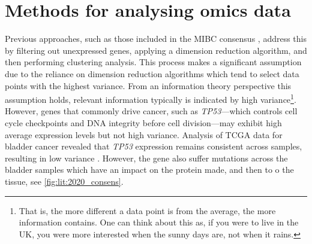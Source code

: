 
\section{Methods for analysing omics data} \label{s:lit:multi-omics}

\vspace{3mm}
\vspace{3mm}



Previous approaches, such as those included in the MIBC consensus \citep{Kamoun2020-tj}, address this by filtering out unexpressed genes, applying a dimension reduction algorithm, and then performing clustering analysis. This process makes a significant assumption due to the reliance on dimension reduction algorithms which tend to select data points with the highest variance. From an information theory perspective this assumption holds, relevant information typically is indicated by high variance\footnote{That is, the more different a data point is from the average, the more information contains. One can think about this as, if you were to live in the UK, you were more interested when the sunny days are, not when it rains.}. However, genes that commonly drive cancer, such as \textit{TP53}—which controls cell cycle checkpoints and DNA integrity before cell division—may exhibit high average expression levels but not high variance. Analysis of TCGA data for bladder cancer revealed that \textit{TP53} expression remains consistent across samples, resulting in low variance \citep{Robertson2017-mg}. However, the gene also suffer mutations across the bladder samples which have an impact on the protein made, and then to o the tissue, see \cref{fig:lit:2020_consens}.

